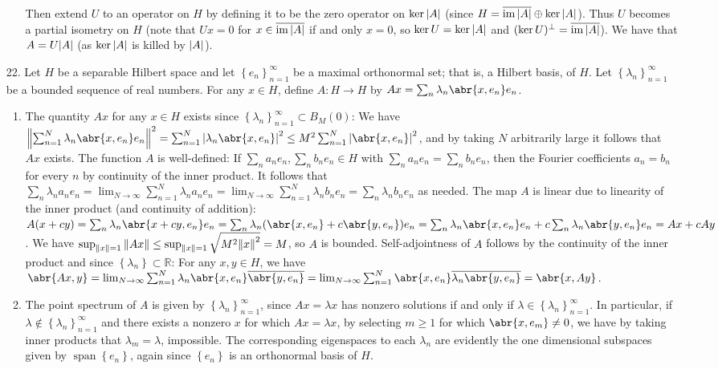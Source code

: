 \documentclass[11pt,leqno]{article}
\theoremstyle{plain}
\theoremstyle{definition}
\numberwithin{equation}{section}
\numberwithin{lem}{section}
\newcommand{\cbr}[1]{\left\{#1\right\}}
\DeclareMathOperator{\Span}{span}
\DeclareMathOperator{\im}{im}
\begin{document}
\begin{enumerate}
\begin{enumerate}
        Then extend $U$ to an operator on $H$ by defining it to be the zero operator on $\ker \abs{A}$ (since $H = \overline{\im \abs{A}} \oplus \ker \abs{A}$). Thus $U$ becomes a partial isometry on $H$ (note that $Ux = 0$ for $x\in\overline{\im \abs{A}}$ if and only $x = 0$, so $\ker U = \ker \abs{A}$ and $(\ker U)^\perp = \overline{\im \abs{A}}$). We have that $A = U\abs{A}$ (as $\ker \abs{A}$ is killed by $\abs{A}$).
    \end{enumerate}
    \item[22.] Let $H$ be a separable Hilbert space and let $\cbr{e_n}_{n=1}^\infty$ be a maximal orthonormal set; that is, a Hilbert basis, of $H$. Let $\cbr{\lambda_n}_{n=1}^\infty$ be a bounded sequence of real numbers. For any $x\in H$, define $A\colon H\to H$ by $Ax= \sum_n\lambda_n\abr{x,e_n}e_n$.
    \begin{enumerate}
      \item The quantity $Ax$ for any $x\in H$ exists since $\cbr{\lambda_n}_{n=1}^\infty\subset B_M(0)$: We have $\norm{\sum_{n=1}^N\lambda_n\abr{x,e_n}e_n}^2 = \sum_{n=1}^N \abs{\lambda_n\abr{x,e_n}}^2\leq M^2\sum_{n=1}^N\abs{\abr{x,e_n}}^2$, and by taking $N$ arbitrarily large it follows that $Ax$ exists. The function $A$ is well-defined: If $\sum_n a_ne_n ,\sum_n b_ne_n\in H$ with $\sum_n a_ne_n =\sum_n b_ne_n$, then the Fourier coefficients $a_n = b_n$ for every $n$ by continuity of the inner product. It follows that $\sum_n\lambda_na_ne_n  = \lim_{N\to\infty} \sum_{n=1}^N\lambda_na_ne_n = \lim_{N\to\infty} \sum_{n=1}^N\lambda_nb_ne_n = \sum_n\lambda_nb_ne_n$ as needed. The map $A$ is linear due to linearity of the inner product (and continuity of addition): $A(x+cy) = \sum_n\lambda_n\abr{x+cy,e_n}e_n = \sum_n\lambda_n(\abr{x,e_n} + c\abr{y,e_n})e_n = \sum_n \lambda_n\abr{x,e_n}e_n + c\sum_n\lambda_n\abr{y,e_n}e_n = Ax + cAy$. We have $\sup_{\norm{x} = 1}\norm{Ax} \leq \sup_{\norm{x} = 1}\sqrt{M^2\norm{x}^2} = M$, so $A$ is bounded. Self-adjointness of $A$ follows by the continuity of the inner product and since $\cbr{\lambda_n}\subset\mathbb R$: For any $x,y\in H$, we have $\abr{Ax,y}= \lim_{N\to\infty}\sum_{n=1}^N \lambda_n\abr{x,e_n}\overline{\abr{y,e_n}} = \lim_{N\to\infty}\sum_{n=1}^N \abr{x,e_n}\overline{\lambda_n\abr{y,e_n}}= \abr{x,Ay}$.
      \item The point spectrum of $A$ is given by $\cbr{\lambda_n}_{n=1}^\infty$, since $Ax=\lambda x$ has nonzero solutions if and only if $\lambda\in \cbr{\lambda_n}_{n=1}^\infty$. In particular, if $\lambda\not\in \cbr{\lambda_n}_{n=1}^\infty$ and there exists a nonzero $x$ for which $Ax = \lambda x$, by selecting $m\geq 1$ for which $\abr{x,e_m}\neq 0$, we have by taking inner products that $\lambda_m = \lambda$, impossible. The corresponding eigenspaces to each $\lambda_n$ are evidently the one dimensional subspaces given by $\Span\cbr{e_n}$, again since $\cbr{e_n}$ is an orthonormal basis of $H$.

\end{enumerate}
\end{enumerate}
\end{document}
